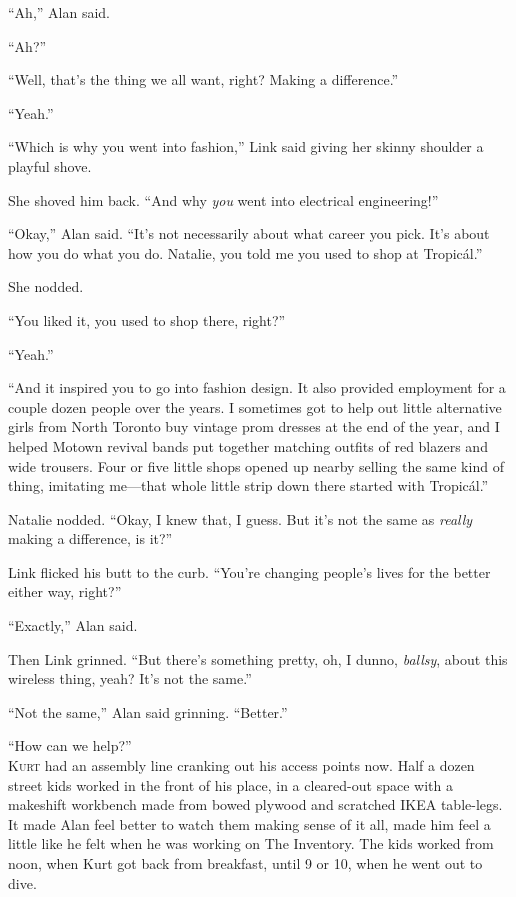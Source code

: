 \documentclass{article}
\begin{document}
``Ah,'' Alan said.

``Ah?''

``Well, that's the thing we all want, right?  Making a difference.''

``Yeah.''

``Which is why you went into fashion,'' Link said giving her skinny
shoulder a playful shove.

She shoved him back.  ``And why \textit{you} went into electrical
engineering!''

``Okay,'' Alan said.  ``It's not necessarily about what career you
pick.  It's about how you do what you do.  Natalie, you told me you
used to shop at Tropic\'{a}l.''

She nodded.

``You liked it, you used to shop there, right?''

``Yeah.''

``And it inspired you to go into fashion design.  It also provided
employment for a couple dozen people over the years.  I sometimes got
to help out little alternative girls from North Toronto buy vintage
prom dresses at the end of the year, and I helped Motown revival bands
put together matching outfits of red blazers and wide trousers.  Four
or five little shops opened up nearby selling the same kind of thing,
imitating me---that whole little strip down there started with
Tropic\'{a}l.''

Natalie nodded.  ``Okay, I knew that, I guess.  But it's not the same
as \textit{really} making a difference, is it?''

Link flicked his butt to the curb.  ``You're changing people's lives
for the better either way, right?''

``Exactly,'' Alan said.

Then Link grinned.  ``But there's something pretty, oh, I dunno,
\textit{ballsy}, about this wireless thing, yeah?  It's not the
same.''

``Not the same,'' Alan said grinning.  ``Better.''

``How can we help?''
\\
\lettrine[lines=3, lhang=.5, nindent=0pt, findent=2pt]{K}{urt} had an assembly line cranking out his access points now.  Half a
dozen street kids worked in the front of his place, in a cleared-out
space with a makeshift workbench made from bowed plywood and scratched
IKEA table-legs.  It made Alan feel better to watch them making sense
of it all, made him feel a little like he felt when he was working on
The Inventory.  The kids worked from noon, when Kurt got back from
breakfast, until 9 or 10, when he went out to dive.
\end{document}
